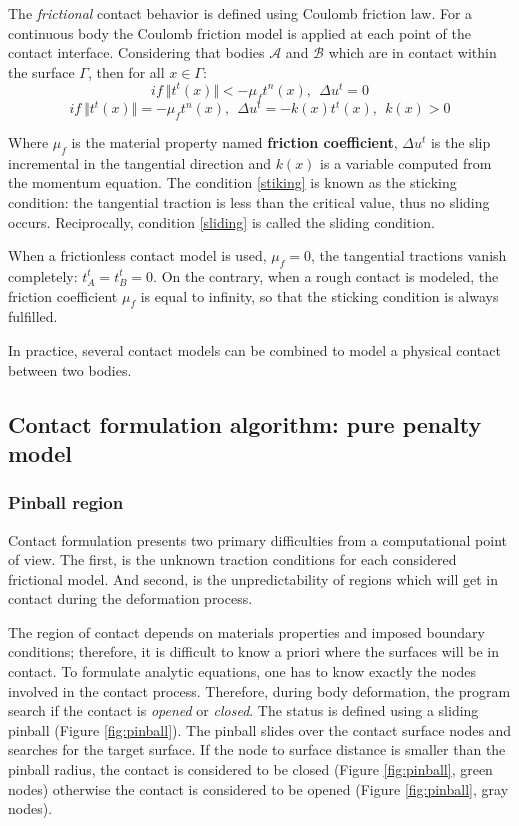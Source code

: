 The \textit{frictional} contact behavior is defined using Coulomb friction law. For a continuous body the Coulomb friction model is applied at each point of the contact interface.
Considering that bodies $\mathcal{A}$ and $\mathcal{B}$ which are in contact within the surface $\Gamma$, then for all $x \in \Gamma$:
\begin{equation}
\label{stiking}
if \ \Vert t^t(x) \Vert < -\mu_f t^n(x),\ \ \Delta u^t=0 
\end{equation}
\begin{equation}
\label{sliding}
if \ \Vert t^t(x) \Vert = -\mu_f t^n(x),\ \ \Delta u^t=-k(x)t^t(x),\ \ k(x)>0
\end{equation}

Where $\mu_f$ is the material property named \textbf{friction coefficient},  $\Delta u^t$ is the slip incremental in the tangential direction and $k(x)$ is a variable computed from the momentum equation. The condition \ref{stiking} is known as the sticking condition: the tangential traction is less than the critical value, thus no sliding occurs. Reciprocally, condition \ref{sliding} is called the sliding condition.

When a frictionless contact model is used, $\mu_f = 0$, the tangential tractions vanish completely: $t_A^t = t_B^t = 0$. On the contrary, when a rough contact is modeled, the friction coefficient $\mu_f$ is equal to infinity, so that the sticking condition is always fulfilled. 

In practice, several contact models can be combined to model a physical contact between two bodies.   

\subsection{Contact formulation algorithm: pure penalty model}%

\subsubsection*{Pinball region}

Contact formulation presents two primary difficulties from a computational point of view. The first, is the unknown traction conditions for each considered frictional model. And second, is the unpredictability of regions which will get in contact during the deformation process.

The region of contact depends on materials properties and imposed boundary conditions; therefore, it is difficult to know a priori where the surfaces will be in contact. To formulate analytic equations, one has to know exactly the nodes involved in the contact process. Therefore, during body deformation, the program search if the contact is \textit{opened} or \textit{closed}. The status is defined using a sliding pinball (Figure \ref{fig:pinball}). The pinball slides over the contact surface nodes and searches for the target surface. If the node to surface distance is smaller than the pinball radius, the contact is considered to be closed (Figure \ref{fig:pinball}, green nodes) otherwise the contact is considered to be opened (Figure \ref{fig:pinball}, gray nodes).    


